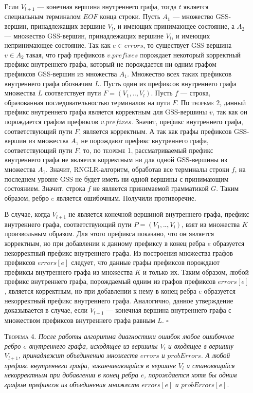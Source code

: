 Если $V_{l+1}$ --- конечная вершина внутреннего графа, тогда $t$ является специальным терминалом $EOF$ конца строки. Пусть $A_{1}$ --- множество GSS-вершин, принадлежащих вершине $V_{l}$, и имеющих принимающее состояние, а $A_{2}$ --- множество GSS-вершин, принадлежащих вершине $V_{l}$, и имеющих непринимающее состояние. Так как $e \in errors$, то существует GSS-вершина $v \in A_{2}$ такая, что граф префиксов $v.prefixes$ порождает некоторый корректный префикс внутреннего графа, который не порождается ни одним графом префиксов GSS-вершин из множества $A_{1}$. Множество всех таких префиксов внутреннего графа обозначим $L$. Пусть один из префиксов внутреннего графа множества $L$ соответствует пути $F = (V_{1},..,V_{l})$. Пусть $f$ --- строка, образованная последовательностью терминалов на пути $F$. По \textsc{теореме 2}, данный префикс внутреннего графа является корректным для GSS-вершины $v$, так как он порождается графом префиксов $v.prefixes$. Значит, префикс внутреннего графа, соответствующий пути $F$, является корректным. А так как графы префиксов GSS-вершин из множества $A_{1}$ не порождают префикс внутреннего графа, соответствующий пути $F$, то, по \textsc{теореме 1}, рассматриваемый префикс внутреннего графа не является корректным ни для одной GSS-вершины из множества $A_{1}$. Значит, RNGLR-алгоритм, обработав все терминалы строки $f$, на последнем уровне GSS не будет иметь ни одной вершины с принимающим состоянием. Значит, строка $f$ не является принимаемой грамматикой $G$. Таким образом, ребро $e$ является ошибочным. Получили противоречие.

В случае, когда $V_{l+1}$ не является конечной вершиной внутреннего графа, префикс внутреннего графа, соответствующий пути $P = (V_{1},..,V_{l})$, взят из множества $K$ произвольным образом. Для этого префикса показано, что он является корректным, но при добавлении к данному префиксу в конец ребра $e$ образуется некорректный префикс внутреннего графа. Из построения множества графов префиксов $errors[e]$ следует, что данные графы префиксов порождают префиксы внутреннего графа из множества $K$ и только их. Таким образом, любой префикс внутреннего графа, порождаемый одним из графов префиксов $errors[e]$, является корректным, но при добавлении к нему в конец ребра $e$ образуется некорректный префикс внутреннего графа. Аналогично, данное утверждение доказывается в случае, если $V_{l+1}$ --- конечная вершина внутреннего графа с множеством префиксов внутреннего графа равным $L$.
$\square$

\textsc{Теорема 4.}
\textit{После работы алгоритма диагностики ошибок любое ошибочное ребро $e$ внутреннего графа, исходящее из вершины $V_{l}$ и входящее в вершину $V_{l+1}$, принадлежит объединению множеств $errors$ и $probErrors$. А любой префикс внутреннего графа, заканчивающийся в вершине $V_{l}$ и становящийся некорректным при добавлении в конец ребра $e$, порождается хотя бы одним графом префиксов из объединения множеств $errors[e]$ и $probErrors[e]$.}

